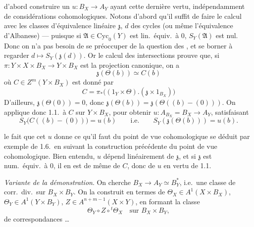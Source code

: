 \documentclass[11pt,a4paper]{article}
\begin{document}
d'abord construire un $u : B_X \to A_Y$ ayant cette dernière vertu, indépendamment de considérations cohomologiques.  Notons d'abord qu'il suffit de faire le calcul avec les classes d'équivalence linéaire $\mathfrak{z}$, $d$ des cycles (ou même l'équivalence d'Albanese) — puisque si $\mathfrak{A} \in \mathrm{Cyc}_0(Y)$ est lin.\ équiv.\ à $0$, $S_Y(\mathfrak{A})$ est nul. Donc on n'a pas besoin de se préoccuper de la question   des \ill{}, et se borner à regarder $d \mapsto S_Y(\mathfrak{z}(d))$. Or le calcul des intersections prouve que, si $\pi : Y \times X \times B_X \to Y \times B_X$ est la projection canonique,  on a 
\[
  \mathfrak{z}(\Theta(b)) \simeq C(b)
\]
où $C \in Z^{m}(Y \times B_X)$ est donné par
\[
  C = \pi_{*}\bigl((1_Y \times \Theta) . (\mathfrak{z} \times 1_{B_X})\bigr)
\]
D'ailleurs, $\mathfrak{z}(\Theta(0)) = 0$, donc $\mathfrak{z}(\Theta(b)) = \mathfrak{z}(\Theta((b) - (0)))$. On applique donc 1.1.\ à $C$ sur $Y \times B_X$, pour obtenir $u : A_{B_X} = B_X \to A_Y$, satisfaisant
\[
  S_Y\bigl(C((b) - (0))\bigr) = u(b) \qquad \text{i.e.} \qquad S_Y(\mathfrak{z}(\Theta(b))) = u(b) .
\]

le fait que cet $u$ donne ce qu'il faut du point de vue cohomologique se déduit par exemple de 1.6.\ en suivant la construction précédente du point de vue cohomologique. Bien entendu, $u$ dépend linéairement de $\mathfrak{z}$, et si $\mathfrak{z}$ est num.\ équiv.\ à $0$, il en est de même de $C$, donc de $u$ en vertu de 1.1.

\emph{Variante de la démonstration}. On cherche $B_X \to A_Y \simeq B_Y^{*}$, i.e.\ une classe de corr.\ div.\ sur $B_X \times B_Y$. On la construit en termes de $\Theta_X \in A^{1}(X \times B_X)$, $\Theta_Y \in A^{1}(Y \times B_Y)$, $Z \in A^{n+m-1}(X \times Y)$,   en formant la classe
\[
  \Theta_Y \circ Z \circ {}^{t}\Theta_X \quad \text{sur } B_X \times B_Y ,
\]
de correspondances …

\end{document}

